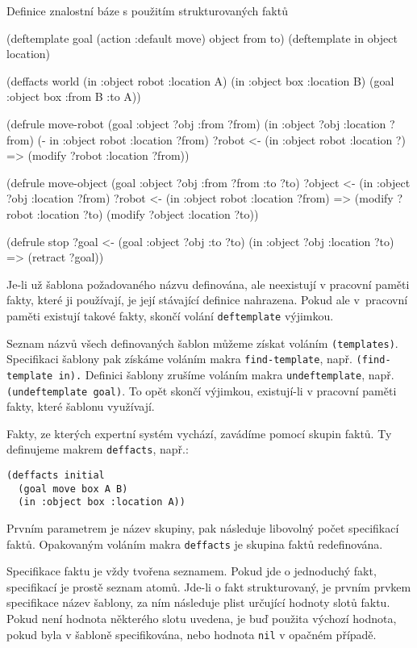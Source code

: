 \begin{listing}[h]
\caption{Definice znalostní báze s použitím strukturovaných faktů}
\label{structured facts}
\begin{clcode}
(deftemplate goal (action :default move) object from to)
(deftemplate in object location)

(deffacts world
  (in :object robot :location A)
  (in :object box :location B)
  (goal :object box :from B :to A))

(defrule move-robot
  (goal :object ?obj :from ?from)
  (in :object ?obj :location ?from)
  (- in :object robot :location ?from)
  ?robot <- (in :object robot :location ?)
  =>
  (modify ?robot :location ?from))

(defrule move-object
  (goal :object ?obj :from ?from :to ?to)
  ?object <- (in :object ?obj :location ?from)
  ?robot <- (in :object robot :location ?from)
  =>
  (modify ?robot :location ?to)
  (modify ?object :location ?to))

(defrule stop
  ?goal <- (goal :object ?obj :to ?to)
  (in :object ?obj :location ?to)
  =>
  (retract ?goal))
\end{clcode}
\end{listing}

Je-li už šablona požadovaného názvu definována, ale neexistují v pracovní
paměti fakty, které ji používají, je její stávající definice nahrazena. Pokud
ale v~pracovní paměti existují takové fakty, skončí volání \verb|deftemplate|
výjimkou.

Seznam názvů všech definovaných šablon můžeme získat voláním \verb|(templates)|.
Specifikaci šablony pak získáme voláním makra
\verb|find-template|, např. \verb|(find-template in).| Definici šablony zrušíme
voláním makra \verb|undeftemplate|, např. \verb|(undeftemplate goal)|. To opět
skončí výjimkou, existují-li v pracovní paměti fakty, které šablonu využívají.

Fakty, ze kterých expertní systém vychází, zavádíme pomocí skupin faktů. Ty
definujeme makrem \verb|deffacts|, např.:
\begin{verbatim}
(deffacts initial
  (goal move box A B)
  (in :object box :location A))
\end{verbatim}
Prvním parametrem je název skupiny, pak následuje libovolný počet specifikací
faktů. Opakovaným voláním makra \verb|deffacts| je skupina faktů
redefinována.

Specifikace faktu je vždy tvořena seznamem. Pokud jde o jednoduchý fakt,
specifikací je prostě seznam atomů. Jde-li o fakt strukturovaný, je prvním
prvkem specifikace název šablony, za ním následuje plist určující hodnoty slotů
faktu. Pokud není hodnota některého slotu uvedena, je buď použita
výchozí hodnota, pokud byla v šabloně specifikována, nebo hodnota \verb|nil| v
opačném případě.

